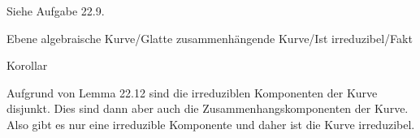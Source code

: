 { Siehe Aufgabe 22.9. }



{Ebene algebraische Kurve/Glatte zusammenhängende Kurve/Ist irreduzibel/Fakt}

{Korollar}

{}

{


\faktsituation {}



\faktzusatz {}

\faktzusatz {}


}

{


Aufgrund von
Lemma 22.12 sind die irreduziblen Komponenten der Kurve disjunkt. Dies sind dann aber auch die Zusammenhangskomponenten der Kurve. Also gibt es nur eine irreduzible Komponente und daher ist die Kurve irreduzibel.


}
